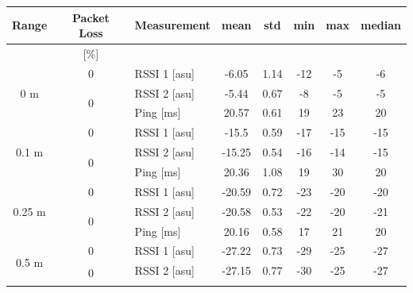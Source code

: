\begin{table}[H]
    \centering
    \begin{tabular}{|c|c|l|c|c|c|c|c|}
    \hline
        Range & Packet Loss & Measurement & mean & std & min & max & median \\\hline
        [meters] & [\%] &  &  &  &  &  &  \\\hline\hline
        \multirow{3}{*}{0 m} & \multirow{1}{*}{0} & RSSI 1 [asu] & -6.05 & 1.14 & -12 & -5 & -6 \\\cline{2-8}\cline{2-8}
        & \multirow{2}{*}{0} & RSSI 2 [asu] & -5.44 & 0.67 & -8 & -5 & -5 \\\cline{3-8}
        && Ping [ms] & 20.57 & 0.61 & 19 & 23 & 20 \\\hline\hline
        \multirow{3}{*}{0.1 m} & \multirow{1}{*}{0} & RSSI 1 [asu] & -15.5 & 0.59 & -17 & -15 & -15 \\\cline{2-8}\cline{2-8}
        & \multirow{2}{*}{0} & RSSI 2 [asu] & -15.25 & 0.54 & -16 & -14 & -15 \\\cline{3-8}
        && Ping [ms] & 20.36 & 1.08 & 19 & 30 & 20 \\\hline\hline
        \multirow{3}{*}{0.25 m} & \multirow{1}{*}{0} & RSSI 1 [asu] & -20.59 & 0.72 & -23 & -20 & -20 \\\cline{2-8}\cline{2-8}
        & \multirow{2}{*}{0} & RSSI 2 [asu] & -20.58 & 0.53 & -22 & -20 & -21 \\\cline{3-8}
        && Ping [ms] & 20.16 & 0.58 & 17 & 21 & 20 \\\hline\hline
        \multirow{3}{*}{0.5 m} & \multirow{1}{*}{0} & RSSI 1 [asu] & -27.22 & 0.73 & -29 & -25 & -27 \\\cline{2-8}\cline{2-8}
        & \multirow{2}{*}{0} & RSSI 2 [asu] & -27.15 & 0.77 & -30 & -25 & -27 \\\cline{3-8}

\end{tabular}
\end{table}
